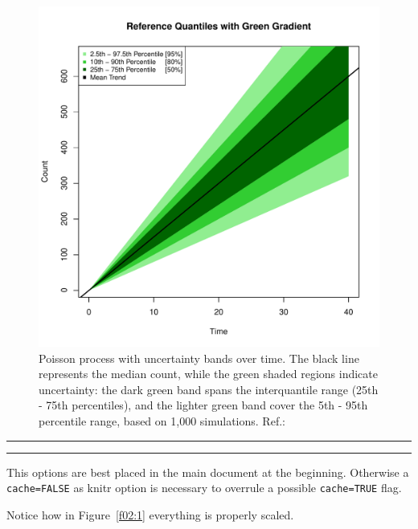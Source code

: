 \begin{figure}
\begin{knitrout}
\color{fgcolor}

{\centering \includegraphics[width=\textwidth-3cm]{figure/ch02_figunnamed-chunk-4-1} 

}


\end{knitrout}
  \caption{Poisson process with uncertainty bands over time. The black line represents the median count, while the green shaded regions indicate uncertainty: the dark green band spans the interquantile range (25th - 75th percentiles), and the lighter green band cover the 5th - 95th percentile range, based on 1,000 simulations. Ref.: \cite{spiegelhalter2011visualizing}}
  \label{fig:2_3}
\end{figure}


\hrule
\hrule

\bigskip 

This options are best placed in the main document at the beginning. Otherwise a \verb+cache=FALSE+ as knitr option is necessary to overrule a possible  \verb+cache=TRUE+ flag. 

\bigskip 

Notice how in Figure~\ref{f02:1} everything is properly scaled.   


